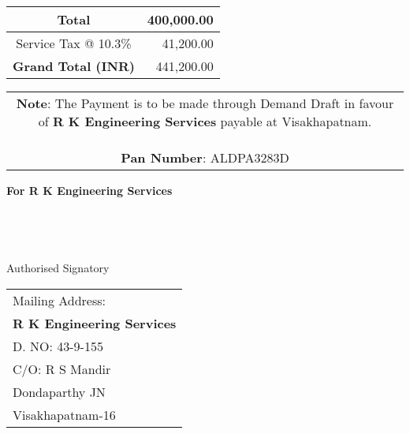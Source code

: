 \documentclass[11pt]{article}
\begin{document}
\vspace*{0.2cm}

\hspace*{11.45cm}
\begin{tabular}{|c|r|}
\hline
Total & 400,000.00 \\
\hline
Service Tax @ 10.3\% & 41,200.00 \\
\hline
{\bf Grand Total (INR)} & 441,200.00 \\
\hline
\end{tabular}

\vspace*{-1.25 cm}
\noindent\begin{tabular}{c}
\parbox{4in}{ {\bf Note}: The Payment is to be made through Demand Draft in favour of {\bf R K Engineering Services} payable at Visakhapatnam. \\ \\
{\noindent \bf Pan Number}:  ALDPA3283D }\\
\end{tabular}
\vspace*{55pt}


{\bf For  R K Engineering Services } \\ \\ \\ \\ \\
 \hspace*{0.6cm}Authorised Signatory
\vspace*{-71pt}
\begin{flushright}
\begin{tabular}{l}
Mailing Address:\\
{\bf R K Engineering Services}\\
D. NO: 43-9-155\\
C/O: R  S Mandir\\
Dondaparthy JN\\ 
Visakhapatnam-16\\
\end{tabular}
\end{flushright}
\end{document}
